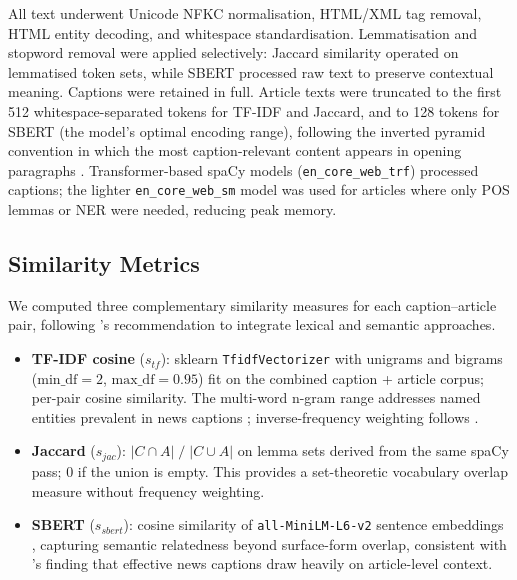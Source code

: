 \documentclass[11pt,a4paper]{article}
\begin{document}
All text underwent Unicode NFKC normalisation, HTML/XML tag removal, HTML
entity decoding, and whitespace standardisation. Lemmatisation and stopword
removal were applied selectively: Jaccard similarity operated on lemmatised
token sets, while SBERT processed raw text to preserve contextual meaning.
Captions were retained in full. Article texts were truncated to the first
512 whitespace-separated tokens for TF-IDF and Jaccard, and to 128 tokens
for SBERT (the model's optimal encoding range), following the inverted
pyramid convention in which the most caption-relevant content appears in
opening paragraphs \citep{yang2021journalistic}. Transformer-based spaCy
models (\texttt{en\_core\_web\_trf}) processed captions; the lighter
\texttt{en\_core\_web\_sm} model was used for articles where only POS
lemmas or NER were needed, reducing peak memory.

\subsection{Similarity Metrics}

We computed three complementary similarity measures for each
caption--article pair, following \citet{Gomaa2013}'s recommendation to
integrate lexical and semantic approaches.

\begin{itemize}\setlength\itemsep{2pt}

\item \textbf{TF-IDF cosine} ($s_{tf}$): sklearn
  \texttt{TfidfVectorizer} with unigrams and bigrams
  ($\mathrm{min\_df} = 2$, $\mathrm{max\_df} = 0.95$) fit on the combined
  caption + article corpus; per-pair cosine similarity. The
  multi-word n-gram range addresses named entities prevalent in news
  captions \citep{liu2021visualnews}; inverse-frequency weighting follows
  \citet{SparckJones1972TermSpecificity}.

\item \textbf{Jaccard} ($s_{jac}$): $|C \cap A|\;/\;|C \cup A|$ on
  lemma sets derived from the same spaCy pass; 0 if the union is empty.
  This provides a set-theoretic vocabulary overlap measure without
  frequency weighting.

\item \textbf{SBERT} ($s_{sbert}$): cosine similarity of
  \texttt{all-MiniLM-L6-v2} sentence embeddings \citep{Reimers2019},
  capturing semantic relatedness beyond surface-form overlap, consistent
  with \citet{Qu2024VACNIC}'s finding that effective news captions draw
  heavily on article-level context.

\end{itemize}
\end{document}
